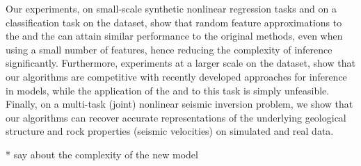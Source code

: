 Our experiments, on small-scale synthetic nonlinear regression tasks and on 
a classification task on the \usps dataset, show that random feature approximations to the 
\egp and the \ugp can attain similar performance to the original methods, 
even when using a small number of features, hence reducing the complexity 
of inference significantly. Furthermore, experiments at a larger scale on 
the \mnist dataset, show that our algorithms are competitive with recently developed 
approaches for inference in \gp models, while the application of the \egp and \ugp to
this task is simply unfeasible. Finally, on a multi-task (joint) nonlinear seismic inversion  problem,
we show that our algorithms can recover accurate representations of the underlying 
geological structure and rock properties (seismic velocities) on simulated and real data.



* say about the complexity of the new model 


 



 






